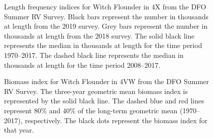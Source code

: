 \documentclass[11pt]{book}
\begin{document}
\begin{figure}[htb]

{\centering {} 

}

\caption{Length frequency indices for Witch Flounder in 4X from the DFO Summer RV Survey. Black bars represent the number in thousands at length from the 2019 survey. Grey bars represent the number in thousands at length from the 2018 survey. The solid black line represents the median in thousands at length for the time period 1970--2017. The dashed black line represents the median in thousands at length for the time period 2008--2017.}\label{fig:57-fig-witchflounder-lengthfreq4X}
\end{figure}

\begin{figure}[htb]

{\centering {} 

}

\caption{Biomass index for Witch Flounder in 4VW from the DFO Summer RV Survey. The three-year geometric mean biomass index is represented by the solid black line. The dashed blue and red lines represent 80\% and 40\% of the long-term geometric mean (1970--2017), respectively. The black dots represent the biomass index for that year.}\label{fig:58-fig-witchflounder-biomass4VW}
\end{figure}
\end{document}
